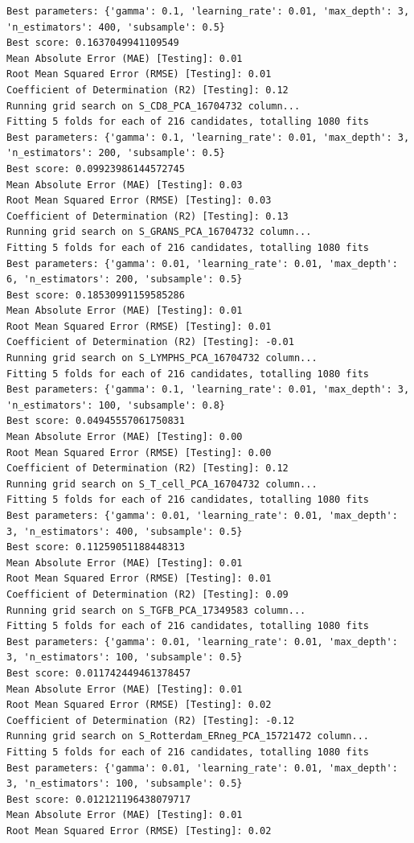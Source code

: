\documentclass[
  letterpaper,
  DIV=11,
  numbers=noendperiod]{scrartcl}
\begin{document}
\begin{verbatim}
Best parameters: {'gamma': 0.1, 'learning_rate': 0.01, 'max_depth': 3, 'n_estimators': 400, 'subsample': 0.5}
Best score: 0.1637049941109549
Mean Absolute Error (MAE) [Testing]: 0.01
Root Mean Squared Error (RMSE) [Testing]: 0.01
Coefficient of Determination (R2) [Testing]: 0.12
Running grid search on S_CD8_PCA_16704732 column...
Fitting 5 folds for each of 216 candidates, totalling 1080 fits
Best parameters: {'gamma': 0.1, 'learning_rate': 0.01, 'max_depth': 3, 'n_estimators': 200, 'subsample': 0.5}
Best score: 0.09923986144572745
Mean Absolute Error (MAE) [Testing]: 0.03
Root Mean Squared Error (RMSE) [Testing]: 0.03
Coefficient of Determination (R2) [Testing]: 0.13
Running grid search on S_GRANS_PCA_16704732 column...
Fitting 5 folds for each of 216 candidates, totalling 1080 fits
Best parameters: {'gamma': 0.01, 'learning_rate': 0.01, 'max_depth': 6, 'n_estimators': 200, 'subsample': 0.5}
Best score: 0.18530991159585286
Mean Absolute Error (MAE) [Testing]: 0.01
Root Mean Squared Error (RMSE) [Testing]: 0.01
Coefficient of Determination (R2) [Testing]: -0.01
Running grid search on S_LYMPHS_PCA_16704732 column...
Fitting 5 folds for each of 216 candidates, totalling 1080 fits
Best parameters: {'gamma': 0.1, 'learning_rate': 0.01, 'max_depth': 3, 'n_estimators': 100, 'subsample': 0.8}
Best score: 0.04945557061750831
Mean Absolute Error (MAE) [Testing]: 0.00
Root Mean Squared Error (RMSE) [Testing]: 0.00
Coefficient of Determination (R2) [Testing]: 0.12
Running grid search on S_T_cell_PCA_16704732 column...
Fitting 5 folds for each of 216 candidates, totalling 1080 fits
Best parameters: {'gamma': 0.01, 'learning_rate': 0.01, 'max_depth': 3, 'n_estimators': 400, 'subsample': 0.5}
Best score: 0.11259051188448313
Mean Absolute Error (MAE) [Testing]: 0.01
Root Mean Squared Error (RMSE) [Testing]: 0.01
Coefficient of Determination (R2) [Testing]: 0.09
Running grid search on S_TGFB_PCA_17349583 column...
Fitting 5 folds for each of 216 candidates, totalling 1080 fits
Best parameters: {'gamma': 0.01, 'learning_rate': 0.01, 'max_depth': 3, 'n_estimators': 100, 'subsample': 0.5}
Best score: 0.011742449461378457
Mean Absolute Error (MAE) [Testing]: 0.01
Root Mean Squared Error (RMSE) [Testing]: 0.02
Coefficient of Determination (R2) [Testing]: -0.12
Running grid search on S_Rotterdam_ERneg_PCA_15721472 column...
Fitting 5 folds for each of 216 candidates, totalling 1080 fits
Best parameters: {'gamma': 0.01, 'learning_rate': 0.01, 'max_depth': 3, 'n_estimators': 100, 'subsample': 0.5}
Best score: 0.012121196438079717
Mean Absolute Error (MAE) [Testing]: 0.01
Root Mean Squared Error (RMSE) [Testing]: 0.02

\end{verbatim}
\end{document}
